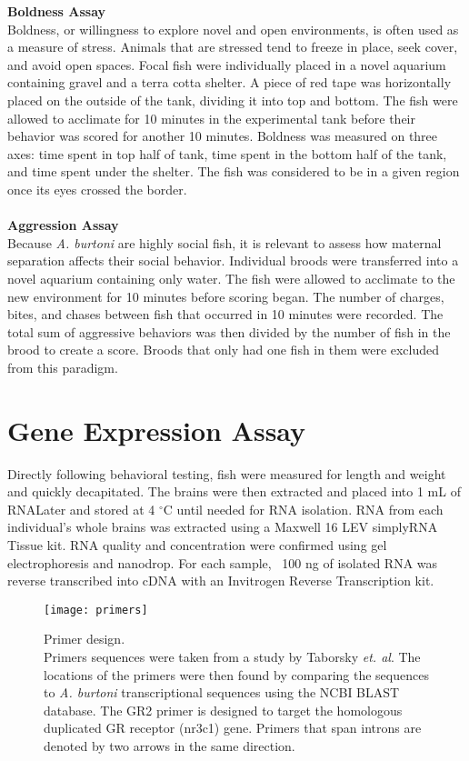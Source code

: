 \documentclass[12pt,twoside]{reedthesis}
\begin{document}
\noindent\textbf{Boldness Assay}\\
Boldness, or willingness to explore novel and open environments, is often used
as a measure of stress. Animals that are stressed tend to freeze in place, seek
cover, and avoid open spaces. Focal fish were individually placed in a novel aquarium
containing gravel and a terra cotta shelter. A piece of red tape was
horizontally placed on the outside of the tank, dividing it into top and bottom.
The fish were allowed to acclimate for
10 minutes in the experimental tank before their behavior was scored for another 10 minutes. Boldness was
measured on three axes: time spent in top half of tank, time spent in the
bottom half of the tank, and time spent under the shelter. The fish was
considered to be in a given region once its eyes crossed the border.\\
\\
\noindent\textbf{Aggression Assay}\\
Because \textit{A. burtoni} are highly social fish, it is relevant to assess how
maternal separation affects their social behavior. Individual broods were
transferred into a novel aquarium containing only water. The fish were allowed
to acclimate to the new environment for 10 minutes before scoring began. The
number of charges, bites, and chases between fish that occurred in 10 minutes
were recorded. The total sum of aggressive behaviors was then divided by the number of fish in the brood to create a score. Broods that only had one fish in them were excluded from this paradigm.  


\section{Gene Expression Assay}
Directly following behavioral testing, fish were measured for length and weight
and quickly decapitated. The brains were then extracted and placed into 1 mL of
RNALater and
stored at 4 $^\circ$C until needed for RNA isolation. RNA from each individual's
whole brains was extracted
using a Maxwell 16 LEV simplyRNA Tissue kit. RNA quality and concentration were confirmed using gel
electrophoresis and nanodrop. For each sample, ~100 ng of isolated RNA was
reverse transcribed into cDNA with an Invitrogen Reverse Transcription kit.

\begin{figure}[htbp] 
\begin{centering} 
\texttt{[image: primers]}
\caption[Primer design]{\footnotesize{Primer design. \\ Primers sequences were taken
  from a study by Taborsky \textit{et. al}. The locations of the primers were then found by
  comparing the sequences to \textit{A. burtoni} transcriptional sequences using
the NCBI BLAST database. The GR2 primer is designed to target the homologous
duplicated GR receptor (nr3c1) gene. Primers that span introns are denoted by two arrows in
the same direction.}} 
\label{subd}
\end{centering} 
\end{figure}
\end{document}
